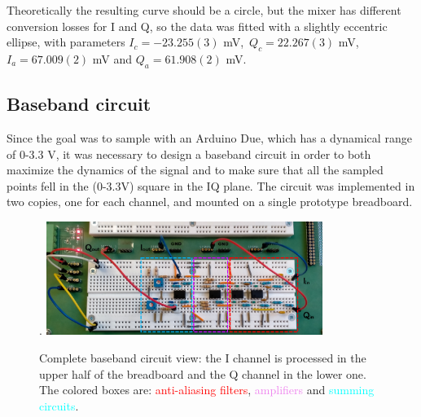 \documentclass[12pt]{article}
\begin{document}
Theoretically the resulting curve should be a circle, but the mixer has different conversion losses for I and Q, so the data was fitted with a slightly eccentric ellipse, with parameters $I_c = -23.255(3)$ mV,\, $Q_c = 22.267(3)$ mV, $I_{a} = 67.009(2)$ mV and $Q_{a}= 61.908(2)$ mV.
\subsection{Baseband circuit}
Since the goal was to sample with an Arduino Due, which has a dynamical range of 0-3.3 V, it was necessary to design a baseband circuit in order to both maximize the dynamics of the signal and to make sure that all the sampled points fell in the (0-3.3V) square in the IQ plane. The circuit was implemented in two copies, one for each channel, and mounted on a single prototype breadboard.
\begin{figure}[H].
        \centering
        \includegraphics[width=0.80\textwidth]{circuitobase.PNG}
        \caption{Complete baseband circuit view: the I channel is processed in the upper half of the breadboard and the Q channel in the lower one. The colored boxes are: \textcolor{red}{anti-aliasing filters}, \textcolor{violet}{amplifiers} and \textcolor{cyan}{summing circuits}.}
        \label{breadboard}
    \end{figure}
\end{document}
